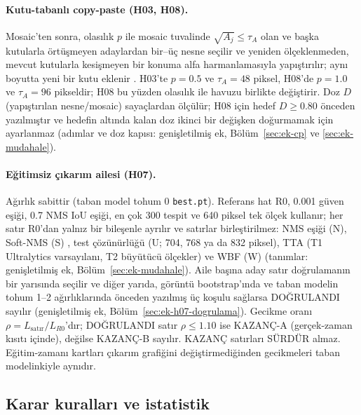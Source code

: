 \documentclass[pdflatex,iicol,sn-mathphys-num]{sn-jnl}
\begin{document}
\paragraph{Kutu-tabanlı copy-paste (H03, H08).}
Mosaic'ten sonra, olasılık $p$ ile mosaic tuvalinde $\sqrt{A_j}\le\tau_A$ olan ve başka kutularla örtüşmeyen adaylardan bir--üç nesne seçilir ve yeniden ölçeklenmeden, mevcut kutularla kesişmeyen bir konuma alfa harmanlamasıyla yapıştırılır; aynı boyutta yeni bir kutu eklenir \cite{dwibedi_2017_cutpaste,kisantal_2019_smallaug}. H03'te $p=0.5$ ve $\tau_A=48$ piksel, H08'de $p=1.0$ ve $\tau_A=96$ pikseldir; H08 bu yüzden olasılık ile havuzu birlikte değiştirir. Doz $D$ (yapıştırılan nesne/mosaic) sayaçlardan ölçülür; H08 için hedef $D\ge0.80$ önceden yazılmıştır ve hedefin altında kalan doz ikinci bir değişken doğurmamak için ayarlanmaz (adımlar ve doz kapısı: genişletilmiş ek, Bölüm~\ref{sec:ek-cp} ve \ref{sec:ek-mudahale}).

\paragraph{Eğitimsiz çıkarım ailesi (H07).}
Ağırlık sabittir (taban model tohum 0 \texttt{best.pt}). Referans hat R0, 0.001 güven eşiği, 0.7 NMS IoU eşiği, en çok 300 tespit ve 640 piksel tek ölçek kullanır; her satır R0'dan yalnız bir bileşenle ayrılır ve satırlar birleştirilmez: NMS eşiği (N), Soft-NMS (S) \cite{bodla_2017_softnms}, test çözünürlüğü (U; 704, 768 ya da 832 piksel), TTA (T1 Ultralytics varsayılanı, T2 büyütücü ölçekler) \cite{ultralytics_2026_yolov5tta,ultralytics_2026_v84165} ve WBF (W) \cite{solovyev_2021_wbf} (tanımlar: genişletilmiş ek, Bölüm~\ref{sec:ek-mudahale}). Aile başına aday satır doğrulamanın bir yarısında seçilir ve diğer yarıda, görüntü bootstrap'ında ve taban modelin tohum 1--2 ağırlıklarında önceden yazılmış üç koşulu sağlarsa DOĞRULANDI sayılır (genişletilmiş ek, Bölüm~\ref{sec:ek-h07-dogrulama}). Gecikme oranı $\rho=L_{\text{satır}}/L_{R0}$'dır; DOĞRULANDI satır $\rho\le1.10$ ise KAZANÇ-A (gerçek-zaman kısıtı içinde), değilse KAZANÇ-B sayılır. KAZANÇ satırları SÜRDÜR almaz. Eğitim-zamanı kartları çıkarım grafiğini değiştirmediğinden gecikmeleri taban modelinkiyle aynıdır.

\subsection{Karar kuralları ve istatistik}\label{sec:karar}
\end{document}
